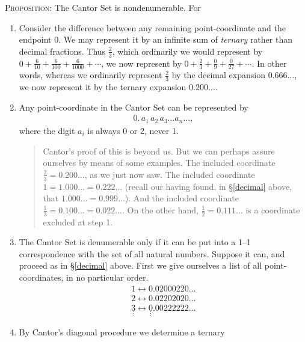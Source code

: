 \documentclass[polutonikogreek,english,twoside,openright]{article}
\begin{document}
\begin{enumerate}
\begin{enumerate}[A.]
    \textsc{Proposition}: The Cantor Set is
    nondenumerable.\label{CantorSetnonden} For
    \begin{enumerate}[(1)]
    \item Consider the difference between any remaining
      point-coordinate and the endpoint 0. We may represent it by an
      infinite sum of \emph{ternary} rather than decimal
      fractions. Thus $\frac{2}{3}$, which ordinarily we would
      represent by
      $0+\frac{6}{10}+\frac{6}{100}+\frac{6}{1000}+\dotsb$, we now
      represent by $0+\frac{2}{3}+\frac{0}{9}+\frac{0}{27}+\dotsb$. In
      other words, whereas we ordinarily represent $\frac{2}{3}$ by
      the decimal expansion $0.666\dotsc$, we now represent it by the
      ternary expansion $0.200\dotsc$.
    \item Any point-coordinate in the Cantor Set can be represented by
      \begin{align*}
        0.\,a_1\,a_2\,a_3\dotsc a_n\dotsc,
        \end {align*}
        where the digit $a_i$ is always 0 or 2, never 1.
        \begin{quote} {\small Cantor's proof of this is beyond us. But
            we can perhaps assure ourselves by means of some
            examples. The included coordinate
            $\frac{2}{3}=0.200\dotsc$, as we just now saw. The
            included coordinate $1=1.000\dotsc=0.222\dotsc$ (recall
            our having found, in \S\ref{decimal} above, that
            $1.000\dotsc=0.999\dotsc$). And the included coordinate
            $\frac{1}{3}=0.100\dotsc = 0.022\dotsc$. On the other
            hand, $\frac{1}{2}=0.111\dotsc$ is a coordinate excluded
            at step 1.}
        \end{quote}
      \item The Cantor Set is denumerable only if it can be put into a
        1--1 correspondence with the set of all natural
        numbers. Suppose it can, and proceed as in \S\ref{decimal}
        above. First we give ourselves a list of all
        point-coordinates, in no particular order.
        \begin{align*}
          1\leftrightarrow0.02000220\dotsc \\
          2\leftrightarrow0.02202020\dotsc \\
          \underset{\vdots}{3}\leftrightarrow\underset{\vdots}{0}.00222222\dotsc
        \end{align*}
      \item By Cantor's diagonal procedure we determine a ternary

\end{enumerate}
\end{enumerate}
\end{enumerate}
\end{document}
